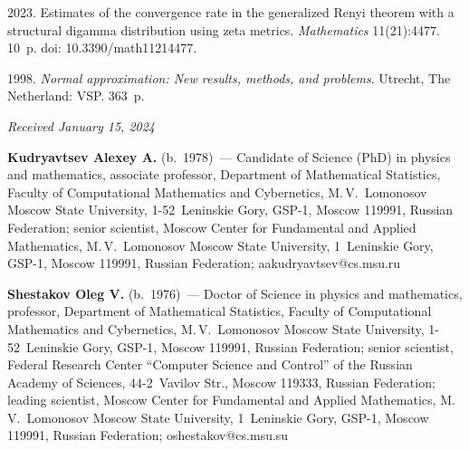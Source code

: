 \begin{multicols}{2}
{{\begin{thebibliography}{99}
 2023.
Estimates of the convergence rate in the generalized Renyi theorem with a structural digamma distribution using zeta metrics.
\textit{Mathematics} 11(21):4477. 10~p. doi: 10.3390/math11214477.

 1998. 
\textit{Normal approximation: New results, methods, and problems}.
Utrecht, The Netherland: VSP. 363~p.

 \end{thebibliography}

 }
 }

\end{multicols}

\vspace*{-6pt}

\hfill{\small\textit{Received January 15, 2024}} 

\vspace*{-18pt}
 
      \Contr

\vspace*{-3pt}


\noindent
\textbf{Kudryavtsev Alexey A.} (b.\ 1978)~--- Candidate of Science (PhD) in physics and mathematics, associate professor, 
Department of Mathematical Statistics, Faculty of Computational Mathematics and Cybernetics, M.\,V.~Lomonosov Moscow State University, 
1-52~Leninskie Gory, GSP-1, Moscow 119991, Russian Federation; senior scientist, Moscow Center for Fundamental and Applied Mathematics, 
M.\,V.~Lomonosov Moscow State University,
1~Leninskie Gory, GSP-1, Moscow 119991, Russian Federation; \mbox{aakudryavtsev@cs.msu.ru}

\vspace*{3pt}

\noindent
\textbf{Shestakov Oleg V.} (b.\ 1976)~--- Doctor of Science in physics and mathematics, professor, 
Department of Mathematical Statistics, Faculty of Computational Mathematics and Cybernetics, M.\,V.~Lomonosov Moscow State University, 
1-52~Leninskie Gory, GSP-1, Moscow 119991, Russian Federation; senior scientist, Federal Research Center ``Computer Science and Control'' 
of the Russian Academy of Sciences, 44-2~Vavilov Str., Moscow 119333, Russian Federation; leading scientist, 
Moscow Center for Fundamental and Applied Mathematics, M.\,V.~Lomonosov Moscow State University, 
1~Leninskie Gory, GSP-1, Moscow 119991, Russian Federation; \mbox{oshestakov@cs.msu.su}


\label{end\stat}

\renewcommand{\bibname}{\protect\rm Литература}